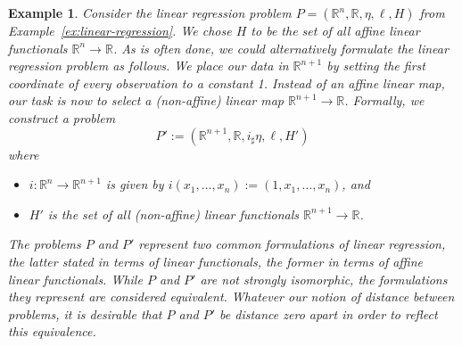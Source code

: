 \documentclass[twoside,11pt]{article}
\newtheorem{examples}[theorem]{Example}
\begin{document}
\begin{examples}\label{ex:linear-regression-formulations}
    Consider the linear regression problem $P = (\mathbb R^n, \mathbb R, \eta,\ell, H)$ from Example~\ref{ex:linear-regression}. We chose $H$ to be the set of all affine linear functionals $\mathbb R^n \to \mathbb R$. As is often done, we could alternatively formulate the linear regression problem as follows. We place our data in $\mathbb R^{n+1}$ by setting the first coordinate of every observation to a constant 1. Instead of an affine linear map, our task is now to select a (non-affine) linear map $\mathbb R^{n+1} \to \mathbb R$. Formally, we construct a problem
    \[P' := (\mathbb R^{n+1}, \mathbb R, i_\sharp \eta, \ell, H')\]
    where
    \begin{itemize}
        \item $i:\mathbb R^n \to \mathbb R^{n+1}$ is given by $i(x_1,\dots, x_n) := (1,x_1,\dots, x_n)$, and
        \item $H'$ is the set of all (non-affine) linear functionals $\mathbb R^{n+1} \to \mathbb R$.
    \end{itemize}
    The problems $P$ and $P'$ represent two common formulations of linear regression, the latter stated in terms of linear functionals, the former in terms of affine linear functionals. While $P$ and $P'$ are not strongly isomorphic, the formulations they represent are considered equivalent. Whatever our notion of distance between problems, it is desirable that $P$ and $P'$ be distance zero apart in order to reflect this equivalence.
\end{examples}
\end{document}
